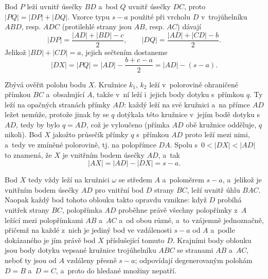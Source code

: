 {    Bod $P$ leží uvnitř úsečky $BD$ a~bod $Q$ uvnitř úsečky $DC$, proto $|PQ| = |DP| + |DQ|$. Vzorce typu $s - a$ použité při vrcholu $D$ v~trojúhelníku $ABD$, resp. $ADC$ (protilehlé strany jsou $AB$, resp. $AC$) dávají
    $$
    |DP| = \frac{|AD| + |BD| - c}{2}, \qquad |DQ| = \frac{|AD| + |CD| - b}{2}.
    $$
    Jelikož $|BD| + |CD| = a$, jejich sečtením dostaneme
    $$
    |DX| = |PQ| = |AD| - \frac{b + c - a}{2} = |AD| - (s - a).
    $$

    Zbývá ověřit polohu bodu $X$. Kružnice $k_1$, $k_2$ leží v~polorovině ohraničené přímkou $BC$ a~obsahující $A$, takže v~ní leží i~jejich body dotyku s~přímkou $q$. Ty leží na opačných stranách přímky $AD$: každý leží na své kružnici a~na přímce $AD$ ležet nemůže, protože jinak by se $q$ dotýkala této kružnice v~jejím bodě dotyku s~$AD$, tedy by bylo $q = AD$, což je vyloučeno (přímka $AD$ obě kružnice odděluje, $q$ nikoli). Bod $X$ jakožto průsečík přímky $q$ s~přímkou $AD$ proto leží mezi nimi, a~tedy ve zmíněné polorovině, tj. na polopřímce $DA$. Spolu s~$0 < |DX| < |AD|$ to znamená, že $X$ je vnitřním bodem úsečky $AD$, a~tak
    $$
    |AX| = |AD| - |DX| = s - a.
    $$

    Bod $X$ tedy vždy leží na kružnici $\omega$ se středem $A$ a~poloměrem $s - a$, a~jelikož je vnitřním bodem úsečky $AD$ pro vnitřní bod $D$ strany $BC$, leží uvnitř úhlu $BAC$. Naopak každý bod tohoto oblouku takto opravdu vznikne: když $D$ probíhá vnitřek strany $BC$, polopřímka $AD$ proběhne právě všechny polopřímky z~$A$ ležící mezi polopřímkami $AB$ a~$AC$ a~od obou různé, a~to vzájemně jednoznačně, přičemž na každé z~nich je jediný bod ve vzdálenosti $s - a$ od $A$ a~podle dokázaného je jím právě bod $X$ příslušející tomuto $D$. Krajními body oblouku jsou body dotyku vepsané kružnice trojúhelníku $ABC$ se stranami $AB$ a~$AC$, neboť ty jsou od $A$ vzdáleny přesně $s - a$; odpovídají degenerovaným polohám $D = B$ a~$D = C$, a~proto do hledané množiny nepatří.
}

